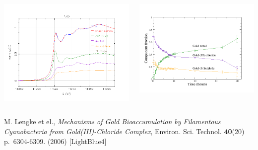 \documentclass[10pt, xcolor=x11names, compress]{beamer}
\begin{document}
\begin{frame}
  \begin{columns}[T]
    \begin{column}{0.5\linewidth}
      \includegraphics[width=\linewidth]{images/AuCl/aucl_lcf.png}
    \end{column}
    \begin{column}{0.5\linewidth}
      \includegraphics[width=\linewidth]{images/AuCl/aucl_results.png}
    \end{column}
  \end{columns}
  \begin{bottomnote}[0.5][19]
    M. Lengke et el., \textit{Mechanisms of Gold Bioaccumulation by
      Filamentous Cyanobacteria from Gold(III)-Chloride Complex},
    Environ. Sci. Technol. \textbf{40}(20) p.~6304-6309. (2006)
    [LightBlue4]
  \end{bottomnote}
\end{frame}
\end{document}
